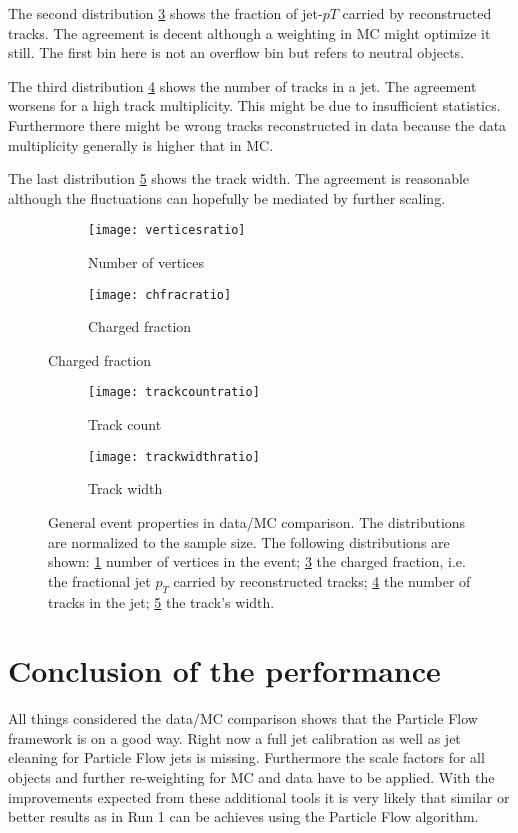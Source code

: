 The second distribution \ref{fig:chfrac} shows the fraction of jet-$pT$ carried by reconstructed tracks. The agreement is decent although a weighting in MC might optimize it still. The first bin here is not an overflow bin but refers to neutral objects.

The third distribution \ref{fig:trackcount} shows the number of tracks in a jet. The agreement worsens for a high track multiplicity. This might be due to insufficient statistics. Furthermore there might be wrong tracks reconstructed in data because the data multiplicity generally is higher that in MC.

The last distribution \ref{fig:trackwidth} shows the track width. The agreement is reasonable although the fluctuations can hopefully be mediated by further scaling.

\begin{figure}[h]
\centering
\begin{subfigure}[b]{0.5\figwidth}
\texttt{[image: verticesratio]}
\caption[Number of vertices]{Number of vertices}
\label{fig:vertices}
\end{subfigure}
\quad
\begin{subfigure}[b]{0.5\figwidth}
\texttt{[image: chfracratio]}
\caption[Charged fraction]{Charged fraction}
\label{fig:chfrac}
\end{subfigure}
\end{figure}


\begin{figure}[h]
\centering
\begin{subfigure}[b]{0.5\figwidth}
\texttt{[image: trackcountratio]}
\caption[Track count]{Track count}
\label{fig:trackcount}
\end{subfigure}
\quad
\begin{subfigure}[b]{0.5\figwidth}
\texttt{[image: trackwidthratio]}
\caption[trackwidth]{Track width}
\label{fig:trackwidth}
\end{subfigure}
\caption{General event properties in data/MC comparison. The distributions are normalized to the sample size. The following distributions are shown: \ref{fig:vertices} number of vertices in the event; \ref{fig:chfrac} the charged fraction, i.e. the fractional jet $p_T$ carried by reconstructed tracks; \ref{fig:trackcount} the number of tracks in the jet; \ref{fig:trackwidth} the track's width.}
\label{fig:generalproperties}
\end{figure}


\section{Conclusion of the performance}

All things considered the data/MC comparison shows that the Particle Flow framework is on a good way. Right now a full jet calibration as well as jet cleaning for Particle Flow jets is missing. Furthermore the scale factors for all objects and further re-weighting for MC and data have to be applied.
With the improvements expected from these additional tools it is very likely that similar or better results as in Run 1 can be achieves using the Particle Flow algorithm.


\label{results}

